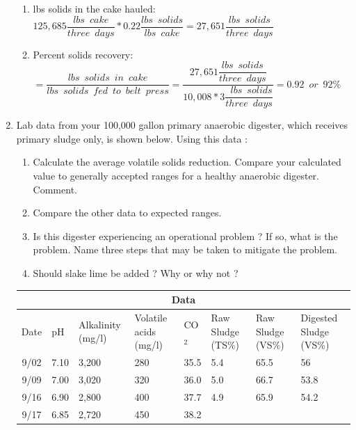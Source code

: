 \documentclass{article}
\begin{document}
\begin{enumerate}
\begin{enumerate}
\item lbs solids in the cake hauled:\\
$
	{125,685 
	\dfrac{lbs \enspace cake}{three \enspace days}}
	*
	{0.22
	\dfrac{lbs \enspace solids}{lbs \enspace cake}}
	=\boxed
	{27,651
	\dfrac{lbs \enspace solids}{three \enspace days}}
$

\item Percent solids recovery:\\
$=
	\dfrac
	{lbs \enspace solids \enspace in \enspace cake}
	{lbs \enspace solids \enspace fed \enspace to \enspace belt \enspace press}
= 	\dfrac
	{27,651 
		\dfrac
		{lbs \enspace solids}{three \enspace days}}
		{10,008*3
			\dfrac
			{\enspace lbs \enspace solids}
			{three \enspace days}}
=\boxed{0.92 \enspace or \enspace 92\%}
$
\end{enumerate}

\item Lab data from your 100,000 gallon primary anaerobic digester, which receives primary sludge only, is shown below. Using this data :
\begin{enumerate}
\item Calculate the average volatile solids reduction. Compare your calculated value to generally accepted ranges for a healthy anaerobic digester. Comment.
\item Compare the other data to expected ranges.
\item Is this digester experiencing an operational problem ? If so, what is the problem. Name three steps that may be taken to mitigate the problem.
\item Should slake lime be added ? Why or why not ?
\end{enumerate}
\begin{tabular}{ |c|p{1cm}|p{1.5cm}|p{1.5cm}|p{1cm}|p{1.5cm}|p{1.5cm}|p{1.5cm}|}
 \hline
 \multicolumn{8}{|c|}{Data} \\
 \hline
Date& pH&Alkalinity (mg/l)&Volatile acids (mg/l)&CO$_2$&Raw Sludge (TS\%)&Raw Sludge (VS\%)&Digested Sludge (VS\%)\\
 \hline
 9/02   & 7.10    &3,200& 280 &35.5 &5.4 & 65.5 & 56\\
 9/09   & 7.00    &3,020& 320 &36.0  &5.0 & 66.7 & 53.8\\
 9/16   & 6.90    &2,800& 400 &37.7 & 4.9 & 65.9 & 54.2\\
 9/17   & 6.85    &2,720& 450 &38.2 & & &\\
 \hline
\end{tabular}\\
\vspace{0.5cm}


\end{enumerate}
\end{document}
